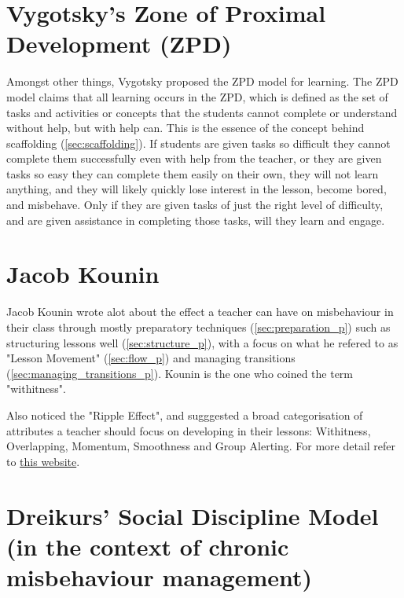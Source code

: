 \documentclass[12pt]{report}
\begin{document}
\section{Vygotsky's Zone of Proximal Development (ZPD)}
\label{sec:zpd_theory}


Amongst other things, Vygotsky proposed the ZPD model for learning. The ZPD model claims that all learning occurs in the ZPD, which is defined as the set of tasks and activities or concepts that the students cannot complete or understand without help, but with help can. This is the essence of the concept behind scaffolding (\ref{sec:scaffolding}). If students are given tasks so difficult they cannot complete them successfully even with help from the teacher, or they are given tasks so easy they can complete them easily on their own, they will not learn anything, and they will likely quickly lose interest in the lesson, become bored, and misbehave. Only if they are given tasks of just the right level of difficulty, and are given assistance in completing those tasks, will they learn and engage.



\section{Jacob Kounin}
\label{sec:kounin_theory}

Jacob Kounin wrote alot about the effect a teacher can have on misbehaviour in their class through mostly preparatory techniques (\ref{sec:preparation_p}) such as structuring lessons well (\ref{sec:structure_p}), with a focus on what he refered to as "Lesson Movement" (\ref{sec:flow_p}) and managing transitions (\ref{sec:managing_transitions_p}). Kounin is the one who coined the term "withitness".

Also noticed the "Ripple Effect", and sugggested a broad categorisation of attributes a teacher should focus on developing in their lessons: Withitness, Overlapping, Momentum, Smoothness and Group Alerting. For more detail refer to \href{http://universityofhullscitts.org.uk/scitts/site/pt/behaviour/kounin.html}{this website}.

\section{Dreikurs' Social Discipline Model (in the context of chronic misbehaviour management)}
\label{sec:dreikur_theory}
\end{document}
